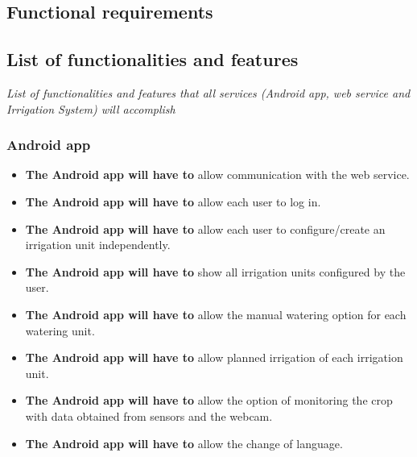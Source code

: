 \documentclass[11pt,a4paper]{article}
\begin{document}
\subsection{Functional requirements}
\subsection{List of functionalities and features}
\textit{List of functionalities and features that all services (Android app, web service and Irrigation System) will accomplish}

\subsubsection{Android app}
\begin{itemize}
\item \textbf{The Android app will have to} allow communication with the web service.

\item \textbf{The Android app will have to} allow each user to log in.

\item \textbf{The Android app will have to} allow each user to configure/create an irrigation unit independently.

\item \textbf{The Android app will have to} show all irrigation units configured by the user.

\item \textbf{The Android app will have to} allow the manual watering option for each watering unit.

\item \textbf{The Android app will have to} allow planned irrigation of each irrigation unit.

\item \textbf{The Android app will have to} allow the option of monitoring the crop with data obtained from sensors and the webcam.

\item \textbf{The Android app will have to} allow the change of language.
\end{itemize}
\end{document}
